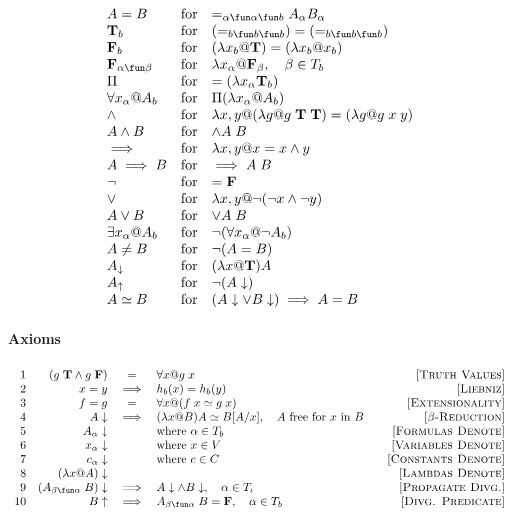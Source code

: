 $$\begin{array}{l@{\mbox{~~~for~~~}}l}
    A = B & =_{\alpha\fun\alpha\fun b}A_\alpha B_\alpha
\\  \TT_b & (=_{b \fun b \fun b}) = (=_{b \fun b \fun b})
\\  \FF_b & (\lambda x_b @ \TT) = (\lambda x_b @ x_b)
\\ \FF_{\alpha\fun\beta} & \lambda x_\alpha @ \FF_\beta, \quad \beta \in T_b
\\ \Pi & =(\lambda x_\alpha \TT_b)
\\ \forall x_\alpha @ A_b & \Pi (\lambda x_\alpha @ A_b)
\\ \land & \lambda x,y @ (\lambda g @ g\;\TT\;\TT) = (\lambda g @ g\;x\;y)
\\ A \land B & \land A\;B
\\ \implies & \lambda x,y @ x = x \land y
\\ A \implies B & \implies A\;B
\\ \lnot & = \FF
\\ \lor & \lambda x,y @ \lnot(\lnot x \land \lnot y)
\\ A \lor B & \lor A\;B
\\ \exists x_\alpha @ A_b & \lnot(\forall x_\alpha @ \lnot A_b)
\\ A \neq B & \lnot(A = B)
\\ A_\downarrow & (\lambda x @ \TT) A
\\ A_\uparrow & \lnot(A\downarrow)
\\ A \simeq B & (A\downarrow \lor B\downarrow) \implies A=B
\end{array}$$

\paragraph{Axioms}

\def\LN#1{\mbox{[\textsc{#1}]}}

$$\begin{array}{rrcl@{\qquad}r}
   1& (g\;\TT \land g\;\FF) &=& \forall x @ g\;x &\LN{Truth Values}
\\ 2& x=y &\implies& h_b(x) = h_b(y) &\LN{Liebniz}
\\ 3& f=g &=& \forall x @ (f\;x \simeq g\;x) & \LN{Extensionality}
\\ 4& A\downarrow
   &\implies&
   (\lambda x @ B)A \simeq B[A/x], \quad A \mbox{ free for }x\mbox{ in }B &\LN{$\beta$-Reduction}
\\ 5& A_\alpha\downarrow && \mbox{where }\alpha \in T_b
   &\LN{Formulas Denote}
\\ 6& x_\alpha\downarrow && \mbox{where }x \in V
   &\LN{Variables Denote}
\\ 7& c_\alpha\downarrow && \mbox{where }c \in C
   &\LN{Constants Denote}
\\ 8& (\lambda x@A)\downarrow &&
   &\LN{Lambdas Denote}
\\ 9& (A_{\beta\fun\alpha}\;B)\downarrow
   &\implies
   & A\downarrow \land B\downarrow, \quad \alpha \in T_\iota
   &\LN{Propagate Divg.}
\\ 10& B\uparrow &\implies& A_{\beta\fun\alpha}\;B = \FF, \quad \alpha \in T_b
   &\LN{Divg. Predicate}
\end{array}$$

